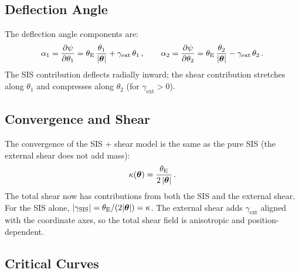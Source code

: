\subsection{Deflection Angle}

The deflection angle components are:
\begin{equation}
    \alpha_1 = \frac{\partial\psi}{\partial\theta_1}
    = \theta_{\mathrm{E}}\,\frac{\theta_1}{|\boldsymbol{\theta}|}
    + \gamma_{\mathrm{ext}}\,\theta_1 \,,
    \qquad
    \alpha_2 = \frac{\partial\psi}{\partial\theta_2}
    = \theta_{\mathrm{E}}\,\frac{\theta_2}{|\boldsymbol{\theta}|}
    - \gamma_{\mathrm{ext}}\,\theta_2 \,.
    \label{eq:alpha_sis_shear}
\end{equation}
The SIS contribution deflects radially inward; the shear contribution
stretches along $\theta_1$ and compresses along $\theta_2$ (for
$\gamma_{\mathrm{ext}} > 0$).

\subsection{Convergence and Shear}

The convergence of the SIS + shear model is the same as the pure SIS
(the external shear does not add mass):
\begin{equation}
    \kappa(\boldsymbol{\theta}) = \frac{\theta_{\mathrm{E}}}{2\,|\boldsymbol{\theta}|} \,.
    \label{eq:kappa_sis_shear}
\end{equation}
The total shear now has contributions from both the SIS and the
external shear.  For the SIS alone,
$|\gamma_{\mathrm{SIS}}| = \theta_{\mathrm{E}}/(2|\boldsymbol{\theta}|) = \kappa$.
The external shear adds $\gamma_{\mathrm{ext}}$ aligned with the
coordinate axes, so the total shear field is anisotropic and
position-dependent.

\subsection{Critical Curves}

